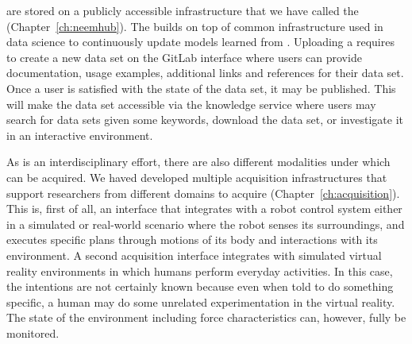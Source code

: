 \neems are stored on a publicly accessible infrastructure that we have called the \neemhub (Chapter~\ref{ch:neemhub}).
The \neemhub builds on top of common infrastructure used in data science to continuously update models learned from \neems.
Uploading a \neem requires to create a new data set on the \neemhub GitLab interface where users can provide documentation, usage examples, additional links and references for their \neem data set.
Once a user is satisfied with the state of the data set, it may be published.
This will make the data set accessible via the knowledge service \openease where users may search for data sets given some keywords, download the data set, or investigate it in an interactive environment.

As \ease is an interdisciplinary effort, there are also different modalities under which \neems can be acquired.
We haved developed multiple acquisition infrastructures that support researchers from different domains to acquire \neems (Chapter~\ref{ch:acquisition}).
This is, first of all, an interface that integrates with a robot control system either in a simulated or real-world scenario where the robot senses its surroundings, and executes specific plans through motions of its body and interactions with its environment.
A second acquisition interface integrates with simulated virtual reality environments in which humans perform everyday activities.
In this case, the intentions are not certainly known because even when told to do something specific, a human may do some unrelated experimentation in the virtual reality.
The state of the environment including force characteristics can, however, fully be monitored.

